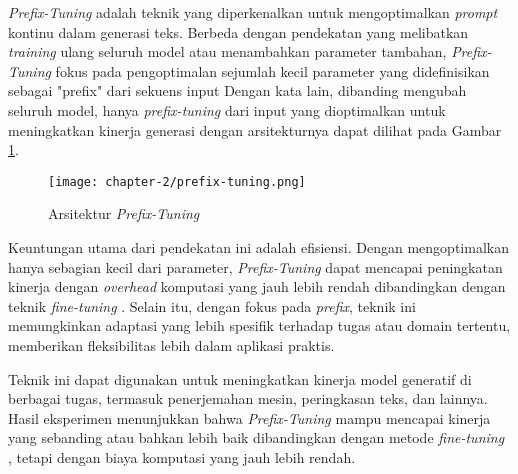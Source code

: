 \textit{Prefix-Tuning} adalah teknik yang diperkenalkan untuk mengoptimalkan \textit{prompt} kontinu dalam generasi teks. Berbeda dengan pendekatan  yang melibatkan \textit{training} ulang seluruh model atau menambahkan parameter tambahan, \textit{Prefix-Tuning} fokus pada pengoptimalan sejumlah kecil parameter yang didefinisikan sebagai "prefix" dari sekuens input \parencite{prefix_tuning} Dengan kata lain, dibanding mengubah seluruh model, hanya \textit{prefix-tuning} dari input yang dioptimalkan untuk meningkatkan kinerja generasi dengan arsitekturnya dapat dilihat pada Gambar \ref{fig:prefix-tuning}.

\begin{figure}[ht]
    \centering
    \texttt{[image: chapter-2/prefix-tuning.png]}
    \caption{Arsitektur \textit{Prefix-Tuning} \parencite{prefix_tuning}}
    \label{fig:prefix-tuning}
\end{figure}

Keuntungan utama dari pendekatan ini adalah efisiensi. Dengan mengoptimalkan hanya sebagian kecil dari parameter, \textit{Prefix-Tuning} dapat mencapai peningkatan kinerja dengan \textit{overhead} komputasi yang jauh lebih rendah dibandingkan dengan teknik \textit{fine-tuning} . Selain itu, dengan fokus pada \textit{prefix}, teknik ini memungkinkan adaptasi yang lebih spesifik terhadap tugas atau domain tertentu, memberikan fleksibilitas lebih dalam aplikasi praktis.

Teknik ini dapat digunakan untuk meningkatkan kinerja model generatif di berbagai tugas, termasuk penerjemahan mesin, peringkasan teks, dan lainnya. Hasil eksperimen menunjukkan bahwa \textit{Prefix-Tuning} mampu mencapai kinerja yang sebanding atau bahkan lebih baik dibandingkan dengan metode \textit{fine-tuning} , tetapi dengan biaya komputasi yang jauh lebih rendah.

